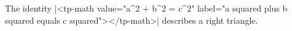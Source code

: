 \documentclass{article}
\begin{document}
The identity \rawhtml*|<tp-math value="a^2 + b^2 = c^2" label="a squared plus b squared equals c squared"></tp-math>| describes a right triangle.
\end{document}
